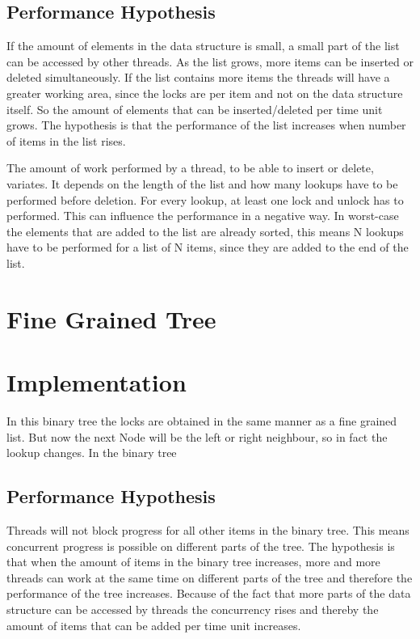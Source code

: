\documentclass[10pt,a4paper]{article}
\begin{document}
\subsection{Performance Hypothesis} If the amount of elements in the data
structure is small, a small part of the list can be accessed by other threads.
As the list grows, more items can be inserted or deleted simultaneously. If the
list contains more items the threads will have a greater working area, since
the locks are per item and not on the data structure itself. So the amount of
elements that can be inserted/deleted per time unit grows.  The hypothesis is
that the performance of the list increases when number of items in the list
rises.

The amount of work performed by a thread, to be able to insert or delete,
variates. It depends on the length of the list and how many lookups have to be
performed before deletion. For every lookup, at least one lock and unlock has
to performed. This can influence the performance in a negative way. In
worst-case the elements that are added to the list are already sorted, this
means N lookups have to be performed for a list of N items, since they are
added to the end of the list.

\section{Fine Grained Tree} \section{Implementation} In this binary tree the
locks are obtained in the same manner as a fine grained list. But now the next
Node will be the left or right neighbour, so in fact the lookup changes. In
the binary tree 

\subsection{Performance Hypothesis} Threads will not block progress for all
other items in the binary tree. This means concurrent progress is possible on
different parts of the tree. The hypothesis is that when the amount of items
in the binary tree increases, more and more threads can work at the same time
on different parts of the tree and therefore the performance of the tree
increases.  Because of the fact that more parts of the data structure can be
accessed by threads the concurrency rises and thereby the amount of items that
can be added per time unit increases.
\end{document}
